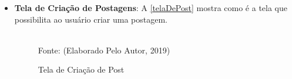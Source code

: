 \begin{itemize}
\begin{figure}[!htpb]
		{\footnotesize Fonte: (Elaborado Pelo Autor, 2019)}
		\label{telaInicial}
	\end{figure}

\newpage
	\item \textbf{Tela de Criação de Postagens}: A \autoref{telaDePost} mostra como é a tela que possibilita ao usuário criar uma postagem.
	\begin{figure}[!htpb]
		\centering
		\caption{Tela de Criação de Post}
		\\
		{\footnotesize Fonte: (Elaborado Pelo Autor, 2019)}
		\label{telaDePost}
	\end{figure}
	

\end{itemize}
